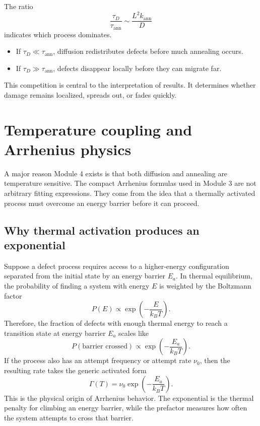 \documentclass[11pt]{article}
\begin{document}
The ratio
\begin{equation}
\frac{\tau_D}{\tau_{\mathrm{ann}}} \sim \frac{L^2 k_{\mathrm{ann}}}{D}
\end{equation}
indicates which process dominates.
\begin{itemize}
    \item If $\tau_D \ll \tau_{\mathrm{ann}}$, diffusion redistributes defects before much annealing occurs.
    \item If $\tau_D \gg \tau_{\mathrm{ann}}$, defects disappear locally before they can migrate far.
\end{itemize}
This competition is central to the interpretation of results. It determines whether damage remains localized, spreads out, or fades quickly.

\section{Temperature coupling and Arrhenius physics}

A major reason Module 4 exists is that both diffusion and annealing are temperature sensitive. The compact Arrhenius formulas used in Module 3 are not arbitrary fitting expressions. They come from the idea that a thermally activated process must overcome an energy barrier before it can proceed.

\subsection{Why thermal activation produces an exponential}

Suppose a defect process requires access to a higher-energy configuration separated from the initial state by an energy barrier $E_a$. In thermal equilibrium, the probability of finding a system with energy $E$ is weighted by the Boltzmann factor
\begin{equation}
P(E) \propto \exp\left(-\frac{E}{k_B T}\right).
\end{equation}
Therefore, the fraction of defects with enough thermal energy to reach a transition state at energy barrier $E_a$ scales like
\begin{equation}
P(\text{barrier crossed}) \propto \exp\left(-\frac{E_a}{k_B T}\right).
\end{equation}
If the process also has an attempt frequency or attempt rate $\nu_0$, then the resulting rate takes the generic activated form
\begin{equation}
\Gamma(T) = \nu_0 \exp\left(-\frac{E_a}{k_B T}\right).
\end{equation}
This is the physical origin of Arrhenius behavior. The exponential is the thermal penalty for climbing an energy barrier, while the prefactor measures how often the system attempts to cross that barrier.
\end{document}
